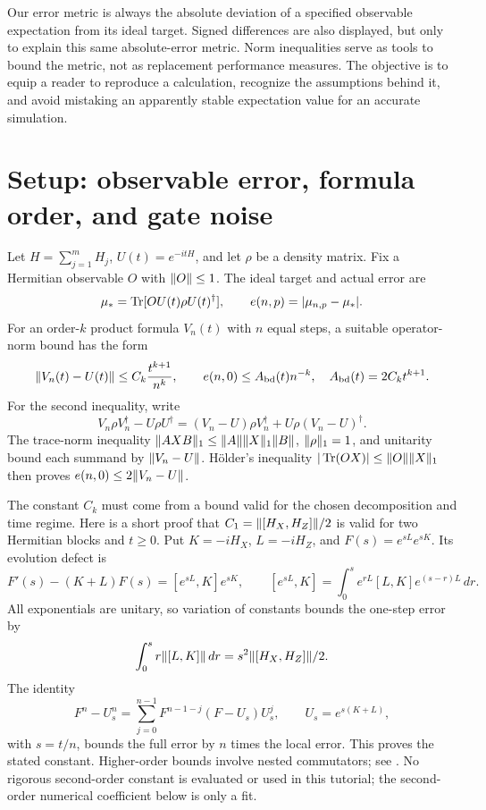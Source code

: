 \documentclass{article}
\newcommand{\Tr}{\operatorname{Tr}}
\DeclarePairedDelimiter{\norm}{\lVert}{\rVert}
\DeclarePairedDelimiter{\abs}{\lvert}{\rvert}
\begin{document}
Our error metric is always the absolute deviation of a specified observable expectation from its ideal target. Signed differences are also displayed, but only to explain this same absolute-error metric. Norm inequalities serve as tools to bound the metric, not as replacement performance measures. The objective is to equip a reader to reproduce a calculation, recognize the assumptions behind it, and avoid mistaking an apparently stable expectation value for an accurate simulation.

\section{Setup: observable error, formula order, and gate noise}
Let $H=\sum_{j=1}^{m}H_j$, $U(t)=e^{-itH}$, and let $\rho$ be a density matrix. Fix a Hermitian observable $O$ with $\norm{O}\leq1$. The ideal target and actual error are
\[
 \mu_* = \Tr[O U(t)\rho U(t)^\dagger],\qquad
 e(n,p)=\abs{\mu_{n,p}-\mu_*}.
\]
For an order-$k$ product formula $V_n(t)$ with $n$ equal steps, a suitable operator-norm bound has the form
\begin{equation}\label{eq:alg}
 \norm{V_n(t)-U(t)}\leq C_k\frac{t^{k+1}}{n^k},\qquad
 e(n,0)\leq A_{\rm bd}(t)n^{-k},\quad
 A_{\rm bd}(t)=2 C_k t^{k+1}.
\end{equation}
For the second inequality, write
\[
 V_n\rho V_n^\dagger-U\rho U^\dagger
 =(V_n-U)\rho V_n^\dagger+U\rho(V_n-U)^\dagger.
\]
The trace-norm inequality $\norm{AXB}_1\leq\norm{A}\norm{X}_1\norm{B}$,
$\norm{\rho}_1=1$, and unitarity bound each summand by $\norm{V_n-U}$.
H\"older's inequality $|\Tr(OX)|\leq\norm{O}\norm{X}_1$ then proves
$e(n,0)\leq2\norm{V_n-U}$.

The constant $C_k$ must come from a bound valid for the chosen decomposition and time regime.
Here is a short proof that $C_1=\norm{[H_X,H_Z]}/2$ is valid for two Hermitian blocks and $t\geq0$.
Put $K=-iH_X$, $L=-iH_Z$, and $F(s)=e^{sL}e^{sK}$.
Its evolution defect is
\[
 F'(s)-(K+L)F(s)=[e^{sL},K]e^{sK},\qquad
 [e^{sL},K]=\int_0^s e^{rL}[L,K]e^{(s-r)L}\,dr.
\]
All exponentials are unitary, so variation of constants bounds the one-step error
by
\[\int_0^s r\norm{[L,K]}\,dr=s^2\norm{[H_X,H_Z]}/2.\]
The identity
\[
 F^n-U_s^n=\sum_{j=0}^{n-1}F^{n-1-j}(F-U_s)U_s^j,
 \qquad U_s=e^{s(K+L)},
\]
with $s=t/n$, bounds the full error by $n$ times the local error.
This proves the stated constant. Higher-order bounds involve nested commutators; see \cite{childs}.
No rigorous second-order constant is evaluated or used in this tutorial; the second-order numerical coefficient below is only a fit.
\end{document}
